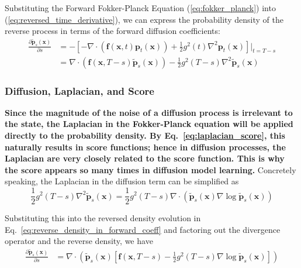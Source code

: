 \documentclass{article}
\begin{document}
Substituting the Forward Fokker-Planck Equation (\ref{eq:fokker_planck}) into (\ref{eq:reversed_time_derivative}), we can express the probability density of the reverse process in terms of the forward diffusion coefficients:
\begin{equation}
\begin{aligned}\label{eq:reverse_density_in_forward_coeff}
    \frac{\partial \tilde{\mathbf{p}}_s(\mathbf{x})}{\partial s} &= -\left[-\nabla \cdot \left(\mathbf{f}(\mathbf{x}, t) \mathbf{p}_t(\mathbf{x})\right) + \frac{1}{2} g^2(t) \nabla^2 \mathbf{p}_t(\mathbf{x})\right]\Big|_{t=T-s} \\
    &= \nabla \cdot \left(\mathbf{f}(\mathbf{x}, T-s) \tilde{\mathbf{p}}_s(\mathbf{x})\right) - \frac{1}{2} g^2(T-s) \nabla^2 \tilde{\mathbf{p}}_s(\mathbf{x})
\end{aligned}
\end{equation}

\subsubsection{Diffusion, Laplacian, and Score}
\textbf{Since the magnitude of the noise of a diffusion process is irrelevant to the state, the Laplacian in the Fokker-Planck equation will be applied directly to the probability density. By Eq.~\eqref{eq:laplacian_score}, this naturally results in score functions; hence in diffusion processes, the Laplacian are very closely related to the score function. This is why the score appears so many times in diffusion model learning. } Concretely speaking, the Laplacian in the diffusion term can be simplified as
\begin{equation}
    \frac{1}{2} g^2(T-s) \nabla^2 \tilde{\mathbf{p}}_s(\mathbf{x}) = \frac{1}{2} g^2(T-s) \nabla \cdot \left(\tilde{\mathbf{p}}_s(\mathbf{x}) \nabla \log \tilde{\mathbf{p}}_s(\mathbf{x})\right)
\end{equation}

Substituting this into the reversed density evolution in Eq.~\eqref{eq:reverse_density_in_forward_coeff} and factoring out the divergence operator and the reverse density, we have
\begin{align}
    \frac{\partial \tilde{\mathbf{p}}_s(\mathbf{x})}{\partial s} &= \nabla \cdot \left(\tilde{\mathbf{p}}_s(\mathbf{x}) \left[\mathbf{f}(\mathbf{x}, T-s) - \frac{1}{2} g^2(T-s) \nabla \log \tilde{\mathbf{p}}_s(\mathbf{x})\right]\right)
    \label{eq:transformed_fp}
\end{align}
\end{document}
